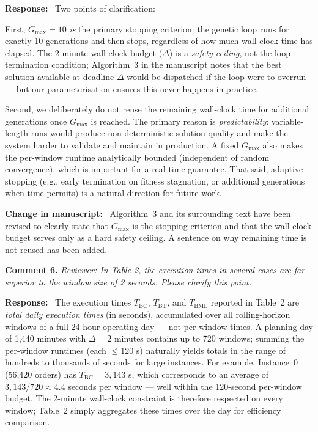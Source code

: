 \documentclass[12pt]{article}
\newcommand{\rev}[1]{\textcolor{revcolor}{\textit{Reviewer: #1}}}
\newcommand{\resp}{\noindent\textbf{Response:}\ }
\newcommand{\change}{\noindent\textbf{Change in manuscript:}\ }
\begin{document}
\resp
Two points of clarification:

First, $G_{\max} = 10$ \emph{is} the primary stopping criterion:
the genetic loop runs for exactly 10 generations and then stops,
regardless of how much wall-clock time has elapsed.
The 2-minute wall-clock budget ($\Delta$) is a \emph{safety
ceiling}, not the loop termination condition;
Algorithm~3 in the manuscript notes that the best solution
available at deadline $\Delta$ would be dispatched if the
loop were to overrun — but our parameterisation ensures
this never happens in practice.

Second, we deliberately do not reuse the remaining wall-clock
time for additional generations once $G_{\max}$ is reached.
The primary reason is \emph{predictability}: variable-length
runs would produce non-deterministic solution quality and
make the system harder to validate and maintain in production.
A fixed $G_{\max}$ also makes the per-window runtime
analytically bounded (independent of random convergence),
which is important for a real-time guarantee.
That said, adaptive stopping (e.g., early termination on
fitness stagnation, or additional generations when time
permits) is a natural direction for future work.

\change
Algorithm~3 and its surrounding text have been revised to
clearly state that $G_{\max}$ is the stopping criterion and
that the wall-clock budget serves only as a hard safety
ceiling. A sentence on why remaining time is not reused
has been added.

\bigskip

\noindent\textbf{Comment 6.}
\rev{In Table 2, the execution times in several cases are far
superior to the window size of 2 seconds. Please clarify this point.}

\resp
The execution times $T_{\text{BC}}$, $T_{\text{BT}}$, and
$T_{\text{BML}}$ reported in Table~2 are \emph{total daily
execution times} (in seconds), accumulated over all rolling-horizon
windows of a full 24-hour operating day — not per-window times.
A planning day of 1,440 minutes with $\Delta = 2$ minutes
contains up to 720 windows; summing the per-window runtimes
(each $\leq 120$ s) naturally yields totals in the range of
hundreds to thousands of seconds for large instances.
For example, Instance~0 (56,420 orders) has $T_{\text{BC}} =
3{,}143$ s, which corresponds to an average of $3{,}143 / 720
\approx 4.4$ seconds per window — well within the 120-second
per-window budget.
The 2-minute wall-clock constraint is therefore respected on
every window; Table~2 simply aggregates these times over
the day for efficiency comparison.
\end{document}
